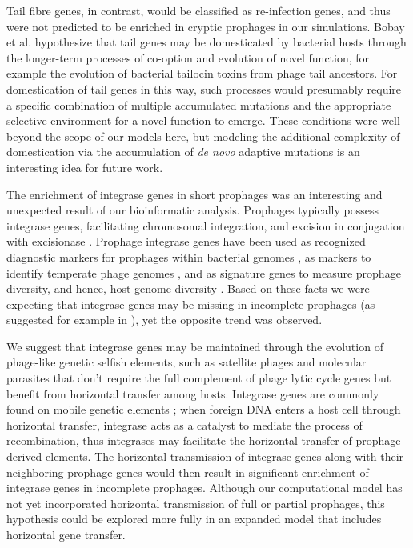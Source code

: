  Tail fibre genes, in contrast, would be classified as re-infection genes, and thus were not predicted to be enriched in cryptic prophages in our simulations.  Bobay et al. \cite{bobay_pervasive_2014} hypothesize that tail genes may be domesticated by bacterial hosts through the longer-term processes of co-option and evolution of novel function, for example the evolution of bacterial tailocin toxins from phage tail ancestors. For domestication of tail genes in this way, such processes would presumably require a specific combination of multiple accumulated mutations and the appropriate selective environment for a novel function to emerge. These conditions were well beyond the scope of our models here, but modeling the additional complexity of domestication via the accumulation of {\it de novo} adaptive mutations is an interesting idea for future work.
 
The enrichment of integrase genes in short prophages was an interesting and unexpected result of our bioinformatic analysis. Prophages typically possess integrase genes, facilitating chromosomal integration, and excision in conjugation with excisionase \cite{groth_phage_2004, casjens_prophages_2003,  frost_mobile_2005, ptashne_genetic_2004}. %
Prophage integrase genes have been used as recognized diagnostic markers for prophages within bacterial genomes \cite{ventura_prophage_2003,tran_sa3mw_2019}, as markers to identify temperate phage genomes \cite{song_prophage_2019}, and as signature genes to measure prophage diversity, and hence, host genome diversity \cite{colavecchio_prophage_2017}.
Based on these facts we were expecting that integrase genes may be missing in incomplete prophages (as suggested for example in \cite{colavecchio_prophage_2017}), yet the opposite trend was observed.

We suggest that integrase genes may be maintained through the evolution of phage-like genetic selfish elements, such as satellite phages and molecular parasites that don’t require the full complement of phage lytic cycle genes but benefit from horizontal transfer among hosts.  Integrase genes are commonly found on mobile genetic elements \cite{domingues_integrons:_2012}; when foreign DNA enters a host cell through horizontal transfer, integrase acts as a catalyst to mediate the process of recombination, thus integrases may facilitate the horizontal transfer of prophage-derived elements. The horizontal transmission of integrase genes along with their neighboring prophage genes would then result in significant enrichment of integrase genes in incomplete prophages.  Although our computational model has not yet incorporated horizontal transmission of full or partial prophages, this hypothesis could be explored more fully in an expanded model that includes horizontal gene transfer. 

 


 


